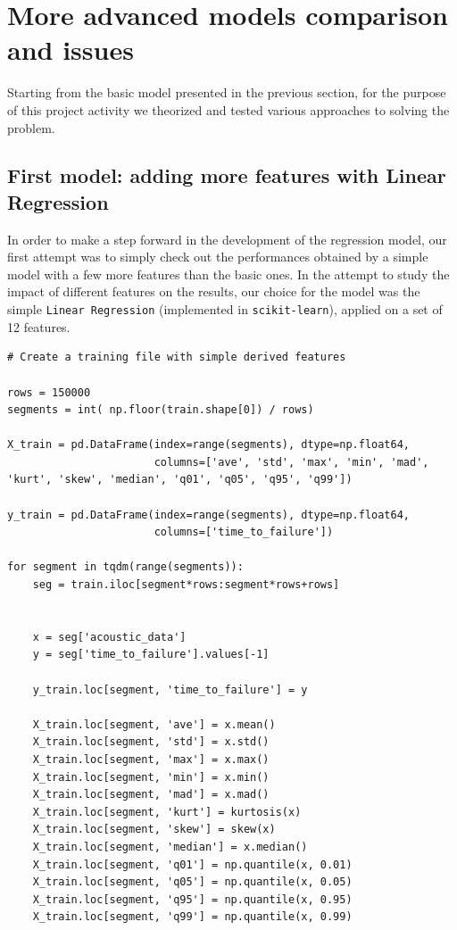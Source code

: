 \chapter{More advanced models comparison and issues}
\label{capitolo3}
\thispagestyle{empty}

\noindent Starting from the basic model presented in the previous section, for the purpose of this project activity we theorized and tested various approaches to solving the problem.

\section[First model]{First model: adding more features with Linear Regression}
\label{3.1}
In order to make a step forward in the development of the regression model, our first attempt was to simply check out the performances obtained by a simple model with a few more features than the basic ones. In the attempt to study the impact of different features on the results, our choice for the model was the simple \texttt{Linear Regression} (implemented in \texttt{scikit-learn}), applied on a set of 12 features.

\begin{lstlisting}[firstnumber=35]
# Create a training file with simple derived features

rows = 150000 
segments = int( np.floor(train.shape[0]) / rows) 

X_train = pd.DataFrame(index=range(segments), dtype=np.float64,
                       columns=['ave', 'std', 'max', 'min', 'mad', 'kurt', 'skew', 'median', 'q01', 'q05', 'q95', 'q99'])

y_train = pd.DataFrame(index=range(segments), dtype=np.float64,
                       columns=['time_to_failure'])
 
for segment in tqdm(range(segments)):
    seg = train.iloc[segment*rows:segment*rows+rows]
    

    x = seg['acoustic_data'] 
    y = seg['time_to_failure'].values[-1]
    
    y_train.loc[segment, 'time_to_failure'] = y
    
    X_train.loc[segment, 'ave'] = x.mean()
    X_train.loc[segment, 'std'] = x.std()
    X_train.loc[segment, 'max'] = x.max()
    X_train.loc[segment, 'min'] = x.min()
    X_train.loc[segment, 'mad'] = x.mad()
    X_train.loc[segment, 'kurt'] = kurtosis(x)
    X_train.loc[segment, 'skew'] = skew(x)
    X_train.loc[segment, 'median'] = x.median()
    X_train.loc[segment, 'q01'] = np.quantile(x, 0.01)
    X_train.loc[segment, 'q05'] = np.quantile(x, 0.05)
    X_train.loc[segment, 'q95'] = np.quantile(x, 0.95)
    X_train.loc[segment, 'q99'] = np.quantile(x, 0.99)
\end{lstlisting}

